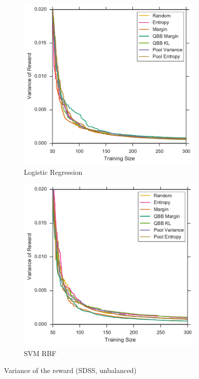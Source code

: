 \begin{figure}[p]
	\centering
	\begin{subfigure}{.5\textwidth}
		\centering
		\includegraphics[width=0.99\textwidth]{figures/5_thompson/sdss_ul_sigmas}
		\caption{Logistic Regression}
		\label{fig:sdss_l_sigmas}
	\end{subfigure}%
	\begin{subfigure}{.5\textwidth}
		\centering
		\includegraphics[width=0.99\linewidth]{figures/5_thompson/sdss_ur_sigmas}
		\caption{SVM RBF}
		\label{fig:sdss_ur_sigmas}
	\end{subfigure}
	\caption[Variance of the reward (SDSS, unbalanced)]{
		Variance of the reward (SDSS, unbalanced)}
	\label{fig:sdss_u_sigmas}
\end{figure}

